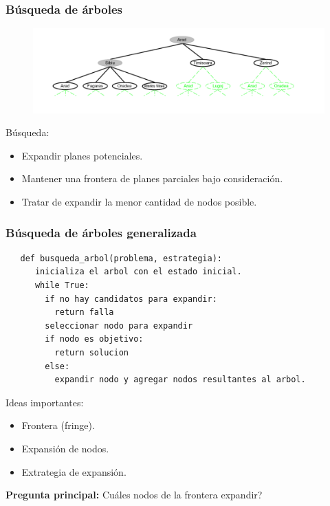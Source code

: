 \documentclass[10pt]{beamer}
\begin{document}
\begin{frame}
  \frametitle{Búsqueda de árboles}

  \begin{figure}[!h] 
    \centering
    \includegraphics[width=\textwidth]{img/arbol2}
  \end{figure} 
  
  Búsqueda:
  \begin{itemize}
    \item Expandir planes potenciales.
    \item Mantener una \alert{frontera} de planes parciales bajo consideración.
    \item Tratar de expandir la \alert{menor cantidad} de nodos posible.
  \end{itemize}
\end{frame}

\begin{frame}[fragile]
  \frametitle{Búsqueda de árboles generalizada}

 \begin{lstlisting}
   def busqueda_arbol(problema, estrategia):
      inicializa el arbol con el estado inicial.
      while True:
        if no hay candidatos para expandir: 
          return falla
        seleccionar nodo para expandir
        if nodo es objetivo:
          return solucion
        else:
          expandir nodo y agregar nodos resultantes al arbol.
 \end{lstlisting}
Ideas importantes:
\begin{itemize}
  \item Frontera (fringe).
  \item Expansión de nodos.
  \item Extrategia de expansión.
\end{itemize}
\pause
\textbf{Pregunta principal:} Cuáles nodos de la frontera expandir?
\end{frame}
\end{document}
